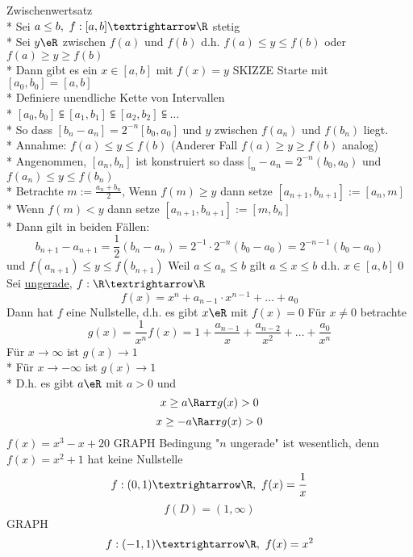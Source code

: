 %
\wdh
Zwischenwertsatz\\*
Sei $a\leq b,\ f:[a,b]→\R$ stetig\\*
Sei $y\eR$ zwischen $f(a)$ und $f(b)$ d.h. $f(a)\leq y\leq f(b)$ oder $f(a)\geq y\geq f(b)$\\*
Dann gibt es ein $x\in[a,b]$ mit $f(x)=y$ SKIZZE
Starte mit $[a_0,b_0]=[a,b]$\\*
Definiere unendliche Kette von Intervallen\\*
$[a_0,b_0]\subseteqq [a_1,b_1]\subseteqq [a_2,b_2]\subseteqq …$\\*
So dass $[b_n-a_n]=2^{-n}[b_0,a_0]$ und $y$ zwischen $f(a_n)$ und $f(b_n)$ liegt.\\*
Annahme: $f(a)\leq y\leq f(b)$ (Anderer Fall $f(a)\geq y\geq f(b)$ analog)\\*
Angenommen, $[a_n,b_n]$ ist konstruiert so dass $[_n-a_n=2^{-n}(b_0,a_0)$ und $f(a_n)\leq y\leq f(b_n)$\\*
Betrachte $m:=\frac{a_n+b_n}{2}$, Wenn $f(m)\geq y$ dann setze $[a_{n+1},b_{n+1}]:=[a_n,m]$\\*
Wenn $f(m)<y$ dann setze $[a_{n+1},b_{n+1}]:=[m,b_n]$\\*
Dann gilt in beiden Fällen:
$$b_{n+1}-a_{n+1}=\frac{1}{2}(b_n-a_n)=2^{-1}·2^{-n}(b_0-a_0)=2^{-n-1}(b_0-a_0)$$
und $f(a_{n+1})\leq y\leq f(b_{n+1})$
\bem
Weil $a\leq a_n\leq b$ gilt $a\leq x\leq b$ d.h. $x\in[a,b]$\qed
{}
Sei \nN{} \ul{ungerade}, $f:\R→\R$
$$f(x)=x^n+a_{n-1}·x^{n-1}+…+a_0$$
Dann hat $f$ eine Nullstelle, d.h. es gibt $x\eR$ mit $f(x)=0$
\bew
Für $x\neq 0$ betrachte
$$g(x)=\frac{1}{x^n}f(x)=1+\frac{a_{n-1}}{x}+\frac{a_{n-2}}{x^2}+…+\frac{a_0}{x^n}$$
Für $x→∞$ ist $g(x)→1$\\*
Für $x→-∞$ ist $g(x)→1$\\*
D.h. es gibt $a\eR$ mit $a>0$ und
$$x\geq a \Rarr g(x)>0$$
$$x\geq -a \Rarr g(x)>0$$
\bsp
$f(x)=x^3-x+20$ GRAPH
\bsp
Bedingung "$n$ ungerade" ist wesentlich, denn $f(x)=x^2+1$ hat keine Nullstelle
\bsp
$$f:(0,1)→\R,\ f(x)=\frac{1}{x}$$
$$f(D)=(1,∞)$$ GRAPH
\bsp
$$f:(-1,1)→\R,\ f(x)=x^2$$
